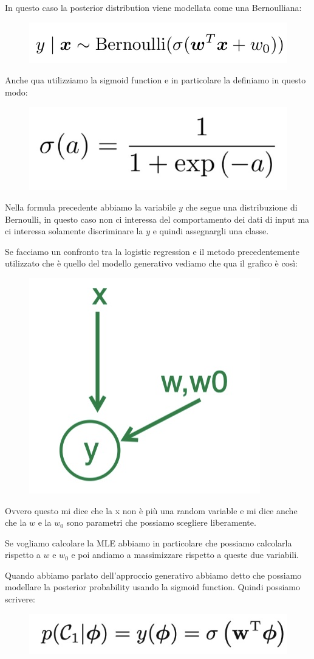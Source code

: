 \documentclass[14pt]{extreport}
\begin{document}
In questo caso la posterior distribution viene modellata come una Bernoulliana:
\begin{figure}[H]
	\centering
	\includegraphics[width=0.5\linewidth]{188.jpeg}
\end{figure}


Anche qua utilizziamo la sigmoid function e in particolare la definiamo in questo modo:

\begin{figure}[H]
	\centering
	\includegraphics[width=0.3\linewidth]{189.jpeg}
\end{figure}

Nella formula precedente abbiamo la variabile $y$ che segue una distribuzione di Bernoulli, in questo caso non ci interessa del comportamento dei dati
di input ma ci interessa solamente discriminare la $y$ e quindi assegnargli una classe.

Se facciamo un confronto tra la logistic regression e il metodo precedentemente utilizzato che è quello del modello generativo vediamo che qua il
grafico è così:

\begin{figure}[H]
	\centering
	\includegraphics[width=0.2\linewidth]{190.jpeg}
\end{figure}

Ovvero questo mi dice che la x non è più una random variable e mi dice anche che la $w$ e la $w_0$ sono parametri che possiamo scegliere liberamente.

Se vogliamo calcolare la MLE abbiamo in particolare che possiamo calcolarla rispetto a $w$ e $w_0$ e poi andiamo a massimizzare rispetto a queste due
variabili.


Quando abbiamo parlato dell'approccio generativo abbiamo detto che possiamo modellare la posterior probability usando la sigmoid function. Quindi
possiamo scrivere:

\begin{figure}[H]
	\centering
	\includegraphics[width=0.5\linewidth]{211.jpeg}
\end{figure}
\end{document}
